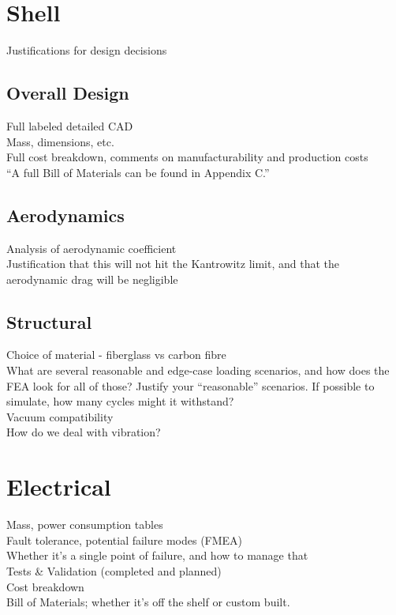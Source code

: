 \documentclass{report}
\begin{document}
    \section{Shell}
    Justifications for design decisions
    \subsection{Overall Design}
    Full labeled detailed CAD\\
    Mass, dimensions, etc.\\
    Full cost breakdown, comments on manufacturability and production costs\\
    “A full Bill of Materials can be found in Appendix C.”
    
    \subsection{Aerodynamics}
    Analysis of aerodynamic coefficient\\
    Justification that this will not hit the Kantrowitz limit, and that the aerodynamic drag will be negligible
    
    \subsection{Structural}
    Choice of material - fiberglass vs carbon fibre\\
    What are several reasonable and edge-case loading scenarios, and how does the FEA look for all of those? Justify your “reasonable” scenarios. If possible to simulate, how many cycles might it withstand?\\
    Vacuum compatibility\\
    How do we deal with vibration?
    
    \section{Electrical}
    Mass, power consumption tables\\
    Fault tolerance, potential failure modes (FMEA)\\
    Whether it’s a single point of failure, and how to manage that\\
    Tests \& Validation (completed and planned)\\
    Cost breakdown\\
    Bill of Materials; whether it’s off the shelf or custom built.\\
    
\end{document}
